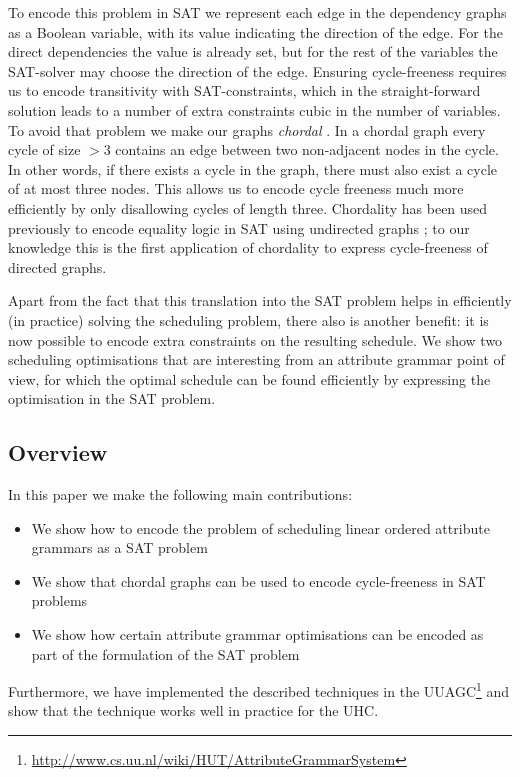 \documentclass{llncs}
\begin{document}
To encode this problem in SAT we represent each edge in the dependency graphs as a Boolean variable, with its value indicating the direction of the edge. For the direct dependencies the value is already set, but for the rest of the variables the SAT-solver may choose the direction of the edge. Ensuring cycle-freeness requires us to encode transitivity with SAT-constraints, which in the straight-forward solution leads to a number of extra constraints cubic in the number of variables. To avoid that problem we make our graphs \emph{chordal} \cite{Dirac:1961}. In a chordal graph every cycle of size $> 3$ contains an edge between two non-adjacent nodes in the cycle. In other words, if there exists a cycle in the graph, there must also exist a cycle of at most three nodes. This allows us to encode cycle freeness much more efficiently by only disallowing cycles of length three. Chordality has been used previously to encode equality logic in SAT using undirected graphs \cite{bryant-chordal}; to our knowledge this is the first application of chordality to express cycle-freeness of directed graphs.

Apart from the fact that this translation into the SAT problem helps in efficiently (in practice) solving the scheduling problem, there also is another benefit: it is now possible to encode extra constraints on the resulting schedule. We show two scheduling optimisations that are interesting from an attribute grammar point of view, for which the optimal schedule can be found efficiently by expressing the optimisation in the SAT problem.

\subsection{Overview}
In this paper we make the following main contributions:
\begin{itemize}
\item We show how to encode the problem of scheduling linear ordered attribute grammars as a SAT problem
\item We show that chordal graphs can be used to encode cycle-freeness in SAT problems
\item We show how certain attribute grammar optimisations can be encoded as part of the formulation of the SAT problem
\end{itemize}
Furthermore, we have implemented the described techniques in the UUAGC\footnote{\url{http://www.cs.uu.nl/wiki/HUT/AttributeGrammarSystem}} \cite{combinator-languages} and show that the technique works well in practice for the UHC.
\end{document}
